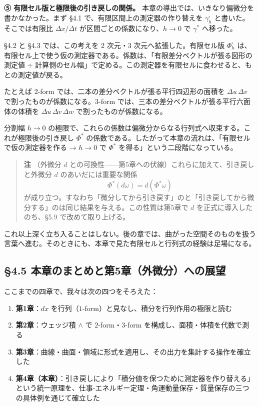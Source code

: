 \documentclass[a4paper,12pt,openany]{book}
\providecommand{\tightlist}{%
  \setlength{\itemsep}{0pt}\setlength{\parskip}{0pt}}
\begin{document}
\textbf{⑤ 有限セル版と極限後の引き戻しの関係。}
本章の導出では、いきなり偏微分を書かなかった。まず §4.1
で、有限区間上の測定器の作り替えを \(\gamma_h^\square\)
と書いた。そこでは有限比 \(\Delta x/\Delta t\)
が区間ごとの係数になり、\(h\to0\) で \(\gamma^*\) へ移った。

§4.2 と §4.3 では、この考えを 2 次元・3 次元へ拡張した。有限セル版
\(\Phi_h^\square\)
は、有限セル上で使う仮の測定器である。係数は、「有限差分ベクトルが張る図形の測定値
\(\div\)
計算側のセル幅」で定める。この測定器を有限セルに食わせると、もとの測定値が戻る。

たとえば \(2\)-form では、二本の差分ベクトルが張る平行四辺形の面積を
\(\Delta u\,\Delta v\) で割ったものが係数になる。\(3\)-form
では、三本の差分ベクトルが張る平行六面体の体積を
\(\Delta u\,\Delta v\,\Delta w\) で割ったものが係数になる。

分割幅 \(h\to0\)
の極限で、これらの係数は偏微分からなる行列式へ収束する。これが極限後の引き戻し
\(\Phi^*\)
の係数である。したがって本章の流れは、「有限セルで仮の測定器を作る →
\(h\to0\) で \(\Phi^*\) を得る」という二段階になっている。

\begin{quote}
\textbf{注} （外微分 \(d\)
との可換性——第5章への伏線）これらに加えて、引き戻しと外微分 \(d\)
のあいだには重要な関係 \[\Phi^*(d\omega) = d(\Phi^*\omega)\]
が成り立つ。すなわち「微分してから引き戻す」のと「引き戻してから微分する」のは同じ結果を与える。この性質は第5章で
\(d\) を正式に導入したのち、§5.9 で改めて取り上げる。
\end{quote}

これ以上深く立ち入ることはしない。後の章では、曲がった空間そのものを扱う言葉へ進む。そのときにも、本章で見た有限セルと行列式の経験は足場になる。

\par\vspace{0.35em}\par

\hypertarget{ux672cux7ae0ux306eux307eux3068ux3081ux3068ux7b2c5ux7ae0ux5916ux5faeux5206ux3078ux306eux5c55ux671b}{%
\subsection{§4.5
本章のまとめと第5章（外微分）への展望}\label{ux672cux7ae0ux306eux307eux3068ux3081ux3068ux7b2c5ux7ae0ux5916ux5faeux5206ux3078ux306eux5c55ux671b}}

ここまでの四章で、我々は次の四つをそろえた：

\begin{enumerate}
\def\labelenumi{\arabic{enumi}.}
\tightlist
\item
  \textbf{第1章}：\(dx\)
  を行列（\(1\)-form）と見なし、積分を行列作用の極限と読む
\item
  \textbf{第2章}：ウェッジ積 \(\wedge\) で \(2\)-form・\(3\)-form
  を構成し、面積・体積を代数で測る
\item
  \textbf{第3章}：曲線・曲面・領域に形式を適用し、その出力を集計する操作を確立した
\item
  \textbf{第4章（本章）}：引き戻しにより「積分値を保つために測定器を作り替える」という統一原理を、仕事-エネルギー定理・角運動量保存・質量保存の三つの具体例を通じて確立した
\end{enumerate}
\end{document}

